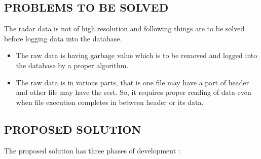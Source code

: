 \documentclass[12pt]{article} %
\begin{document}
\subsection{PROBLEMS TO BE SOLVED}
\noindent  The radar data is not of high resolution and following things are to be solved before logging data into the database.
\begin{itemize}
\item The raw data is having garbage value which is to be removed and logged into the database by a proper algorithm.
\item The  raw data is in various parts, that is one file may have a part of header and other file may have the rest. So, it  requires proper reading of data even when file execution completes in between header or its data.
 \end{itemize}

\subsection{PROPOSED SOLUTION }
\noindent The proposed solution has three phases of development :
\end{document}
